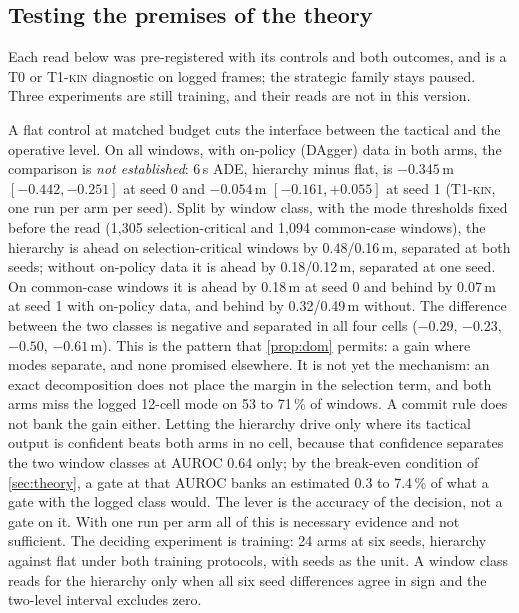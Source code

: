 \documentclass[10pt,twocolumn]{article}
\makeatletter
\theoremstyle{remark}
\newcommand{\tier}[1]{\textsc{\small #1}}
\renewcommand\paragraph{\@startsection{paragraph}{4}{\z@}{1.6ex \@plus .5ex \@minus .2ex}{-1em}{\normalfont\normalsize\bfseries}}
\makeatother
\begin{document}
\subsection{Testing the premises of the theory}\label{sec:premises}
Each read below was pre-registered with its controls and both outcomes, and is a \tier{T0} or \tier{T1-kin} diagnostic on logged
frames; the strategic family stays paused. Three experiments are still training, and their reads are not in this version.

\paragraph{Hierarchy against a flat control (T2).} A flat control at matched budget cuts the interface between the tactical and the
operative level. On all windows, with on-policy (DAgger) data in both arms, the comparison is \emph{not established}: 6\,s ADE,
hierarchy minus flat, is $-0.345$\,m $[-0.442,-0.251]$ at seed 0 and $-0.054$\,m $[-0.161,+0.055]$ at seed 1 (\tier{T1-kin}, one run
per arm per seed). Split by window class, with the mode thresholds fixed before the read (1,305 selection-critical and 1,094
common-case windows), the hierarchy is ahead on selection-critical windows by 0.48/0.16\,m, separated at both seeds; without
on-policy data it is ahead by 0.18/0.12\,m, separated at one seed. On common-case windows it is ahead by 0.18\,m at seed 0 and behind
by 0.07\,m at seed 1 with on-policy data, and behind by 0.32/0.49\,m without. The difference between the two classes is negative and
separated in all four cells ($-0.29$, $-0.23$, $-0.50$, $-0.61$\,m). This is the pattern that \cref{prop:dom} permits: a gain where
modes separate, and none promised elsewhere. It is not yet the mechanism: an exact decomposition does not place the margin in the
selection term, and both arms miss the logged 12-cell mode on 53 to 71\,\% of windows. A commit rule does not bank the gain either.
Letting the hierarchy drive only where its tactical output is confident beats both arms in no cell, because that confidence
separates the two window classes at AUROC 0.64 only; by the break-even condition of \cref{sec:theory}, a gate at that AUROC banks an
estimated 0.3 to 7.4\,\% of what a gate with the logged class would. The lever is the accuracy of the decision, not a gate on it.
With one run per arm all of this is necessary evidence and not sufficient. The deciding experiment is training: 24 arms at six seeds, hierarchy against flat under both training protocols,
with seeds as the unit. A window class reads for the hierarchy only when all six seed differences agree in sign and the two-level
interval excludes zero.
\end{document}
